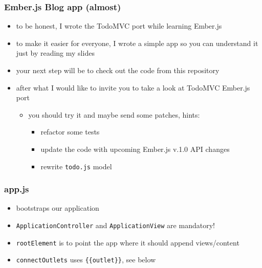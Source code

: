 \documentclass[compress]{beamer}
\begin{document}
\begin{frame}

\frametitle{Ember.js Blog app (almost)}

\begin{itemize}[<+->]
  \item to be honest, I wrote the TodoMVC port while learning Ember.js
  \item to make it easier for everyone, I wrote a simple app so you can understand it just by reading my slides
  \item your next step will be to check out the code from this repository
  \item after what I would like to invite you to take a look at TodoMVC Ember.js port
  \begin{itemize}[<+->]
    \item you should try it and maybe send some patches, hints:
    \begin{itemize}[<+->]
      \item refactor some tests
      \item update the code with upcoming Ember.js v.1.0 API changes
      \item rewrite \texttt{todo.js} model
    \end{itemize}
  \end{itemize}
\end{itemize}

\end{frame}

\begin{frame}

\frametitle{app.js}

\begin{itemize}[<+->]
  \item bootstraps our application
  \item \texttt{ApplicationController} and \texttt{ApplicationView} are mandatory!
  \item \texttt{rootElement} is to point the app where it should append views/content
  \item  \texttt{connectOutlets} uses \texttt{\{\{outlet\}\}}, see below
\end{itemize}

\inputminted[fontsize=\tiny,gobble=2,linenos=true,firstline=6,lastline=16]{javascript}{code/js/app.js}

\end{frame}
\end{document}
